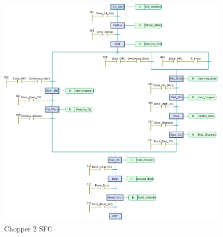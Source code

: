 \documentclass{article}
\begin{document}
        \begin{figure}[h]
            \centering
            \includegraphics[scale=0.6]{img/ch2_sfc}
            \caption{Chopper 2 SFC}
            \label{fig:ch2_sfc}
        \end{figure}

\pagebreak



\end{document}
